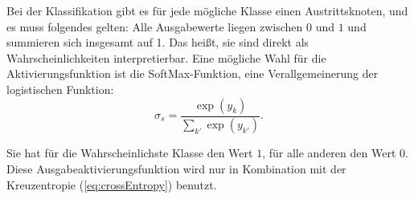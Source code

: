 Bei der Klassifikation gibt es für jede mögliche Klasse einen Austrittsknoten, und es muss folgendes gelten:
Alle Ausgabewerte liegen zwischen $0$ und $1$ und summieren sich insgesamt auf 1.
Das heißt, sie sind direkt als Wahrscheinlichkeiten interpretierbar. Eine mögliche Wahl für die Aktivierungsfunktion ist die SoftMax-Funktion, eine Verallgemeinerung der logistischen Funktion:
\begin{equation}
\label{eq:softmax}
	\sigma_s = \frac{\exp (y_k)}{\sum_{k'} \exp (y_{k'})}.
\end{equation}

Sie hat für die Wahrscheinlichste Klasse den Wert $1$, für alle anderen den Wert $0$. Diese Ausgabeaktivierungsfunktion wird nur in Kombination mit der Kreuzentropie (\ref{eq:crossEntropy}) benutzt\cite{bishop1995neural}. 
